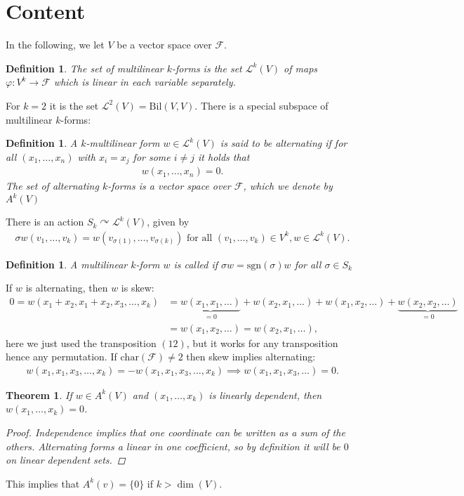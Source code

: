 \documentclass[10pt,twoside,openany,final]{memoir}
\def\sgn{\mathrm{sgn}}
\def\acts{\curvearrowright}
\theoremstyle{break}
\newtheorem{theorem}[section]{Theorem}
\newtheorem{definition}[section]{Definition}
\theoremstyle{Break}
\newcommand{\F}{\mathcal{F}}
\newcommand{\Bil}{\mathrm{Bil}}
\let\emph\relax
\begin{document}
\section*{Content}
In the following, we let $V$ be a vector space over $\F$.
\begin{definition}
	The set of multilinear $k$-forms is the set $\mathcal{L}^k(V)$ of maps $\varphi \colon V^k \to \F$ which is linear in each variable separately.
\end{definition}
For $k=2$ it is the set $\mathcal{L}^2(V)=\Bil(V,V)$. There is a special subspace of multilinear $k$-forms:
\begin{definition}
	A $k$-multilinear form $w \in \mathcal{L}^k(V)$ is said to be alternating if for all $(x_1,\dots,x_n)$ with $x_i=x_j$ for some $i\neq j$ it holds that
	\begin{align*}
		w(x_1,\dots,x_n)=0.
	\end{align*}
	The set of alternating $k$-forms is a vector space over $\F$, which we denote by $A^k(V)$
\end{definition}
There is an action $S_k \acts \mathcal{L}^k(V)$, given by 
\begin{align*}
	\sigma w(v_1,\dots,v_k)=w(v_{\sigma(1)},\dots,v_{\sigma(k)}) \text{ for all } (v_1,\dots,v_k) \in V^k, w \in \mathcal{L}^k(V).
\end{align*}
\begin{definition}
	A multilinear $k$-form $w$ is called \emph{skew} if $\sigma w = \sgn(\sigma) w $ for all $\sigma \in S_k$
\end{definition}

If $w$ is alternating, then $w$ is skew: 
\begin{align*}
	0=w(x_1+x_2,x_1+x_2,x_3,\dots,x_k)&=\underbrace{w(x_1,x_1,\dots)}_{=0}+w(x_2,x_1,\dots)+w(x_1,x_2,\dots)+\underbrace{w(x_2,x_2,\dots)}_{=0}\\
	&=w(x_1,x_2,\dots)=w(x_2,x_1,\dots),
\end{align*}
here we just used the transposition $(12)$, but it works for any transposition hence any permutation. If $\textrm{char}(\F)\neq 2$ then skew implies alternating:
\begin{align*}
	w(x_1,x_1,x_3,\dots,x_k)=-w(x_1,x_1,x_3,\dots,x_k) \implies w(x_1,x_1,x_3,\dots)=0.
\end{align*}
\begin{theorem}
	If $w \in A^k(V)$ and $(x_1,\dots,x_k)$ is linearly dependent, then $w(x_1,\dots,x_k)=0$.
	\begin{proof}
		Independence implies that one coordinate can be written as a sum of the others. Alternating forms a linear in one coefficient, so by definition it will be $0$ on linear dependent sets.
	\end{proof}
\end{theorem}
This implies that $A^k(v)=\{0\}$ if $k > \dim(V)$.
\end{document}
